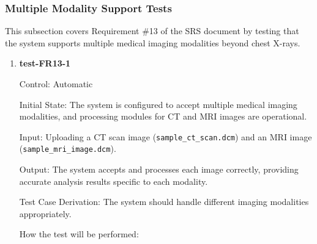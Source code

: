 \documentclass[12pt, titlepage]{article}
\begin{document}
\subsubsection{Multiple Modality Support Tests}

This subsection covers Requirement \#13 of the SRS document by testing that the system supports multiple medical imaging modalities beyond chest X-rays.

\begin{enumerate}

\item \textbf{test-FR13-1} \label{test-FR13-1}

Control: Automatic

Initial State: The system is configured to accept multiple medical imaging modalities, and processing modules for CT and MRI images are operational.

Input: Uploading a CT scan image (\texttt{sample\_ct\_scan.dcm}) and an MRI image (\texttt{sample\_mri\_image.dcm}).

Output: The system accepts and processes each image correctly, providing accurate analysis results specific to each modality.

Test Case Derivation: The system should handle different imaging modalities appropriately.

How the test will be performed:


\end{enumerate}
\end{document}
